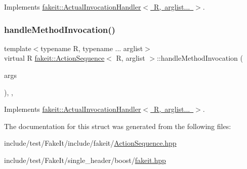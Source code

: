 Implements \mbox{\hyperlink{structfakeit_1_1ActualInvocationHandler_ad44424f6b71c6d5587e80057771d1717}{fakeit\+::\+Actual\+Invocation\+Handler$<$ R, arglist... $>$}}.

\mbox{\label{structfakeit_1_1ActionSequence_a7bc46308e2c35fe407f30045d4ce05a0}} 
\subsubsection{\texorpdfstring{handleMethodInvocation()}{handleMethodInvocation()}\hspace{0.1cm}{\footnotesize\ttfamily [9/9]}}
{\footnotesize\ttfamily template$<$typename R, typename ... arglist$>$ \\
virtual R \mbox{\hyperlink{structfakeit_1_1ActionSequence}{fakeit\+::\+Action\+Sequence}}$<$ R, arglist $>$\+::handle\+Method\+Invocation (\begin{DoxyParamCaption}\item[{\mbox{\hyperlink{namespacefakeit_a476a37a598825e1b5dd67b3a176491a1}{Arguments\+Tuple}}$<$ arglist... $>$ \&}]{args }\end{DoxyParamCaption})\hspace{0.3cm}{\ttfamily [inline]}, {\ttfamily [override]}, {\ttfamily [virtual]}}



Implements \mbox{\hyperlink{structfakeit_1_1ActualInvocationHandler_ad44424f6b71c6d5587e80057771d1717}{fakeit\+::\+Actual\+Invocation\+Handler$<$ R, arglist... $>$}}.



The documentation for this struct was generated from the following files\+:\begin{DoxyCompactItemize}
\item 
include/test/\+Fake\+It/include/fakeit/\mbox{\hyperlink{ActionSequence_8hpp}{Action\+Sequence.\+hpp}}\item 
include/test/\+Fake\+It/single\+\_\+header/boost/\mbox{\hyperlink{single__header_2boost_2fakeit_8hpp}{fakeit.\+hpp}}\end{DoxyCompactItemize}
